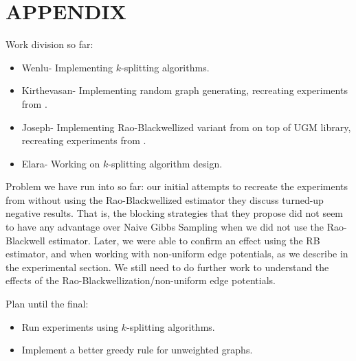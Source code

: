 \documentclass{article} %
\begin{document}
\section*{APPENDIX}
\noindent Work division so far:
\begin{itemize}
\item Wenlu- Implementing $k$-splitting algorithms.
\item Kirthevasan- Implementing random graph generating, recreating experiments from \cite{hamze2006information}.
\item Joseph- Implementing Rao-Blackwellized variant from \cite{hamze2006information} on top of UGM library, recreating experiments from \cite{hamze2006information}.
\item Elara- Working on $k$-splitting algorithm design.
\end{itemize}

Problem we have run into so far: our initial attempts to recreate the
experiments from \cite{hamze2006information} without using the
Rao-Blackwellized estimator they discuss turned-up negative results.  That is,
the blocking strategies that they propose did not seem to have any advantage
over Naive Gibbs Sampling when we did not use the Rao-Blackwell estimator.
Later, we were able to confirm an effect using the RB estimator, and when
working with non-uniform edge potentials, as we describe in the experimental
section. We still need to do further work to understand the effects of the
Rao-Blackwellization/non-uniform edge potentials.

\noindent Plan until the final:
\begin{itemize}
\item Run experiments using $k$-splitting algorithms.
\item Implement a better greedy rule for unweighted graphs.
\end{itemize}
\end{document}

